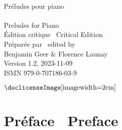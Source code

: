 \documentclass[a4paper, 12pt]{book}
\newcommand{\bigdot}[0]{{\Large \textbullet}}
\begin{document}
\frontmatter


\begin{titlepage}
\begin{center}
   \\
  \vspace{3.1 cm}
  {\fontsize{30}{40}\selectfont Préludes pour piano} \\
  \vspace{0.5 cm}
  {\fontsize{30}{40}\selectfont \textbullet} \\
  \vspace{0.35 cm}
  {\fontsize{30}{40}\selectfont Preludes for Piano} \\
  \vspace{3.1 cm}
  {\Large Édition critique \textbullet\ Critical Edition} \\
  \vspace{3.1 cm}
  {\Large Préparée par \textbullet\ \foreignlanguage{english}{edited by}} \\
  \vspace{0.25 cm}
  {\Large Benjamin Geer \& Florence Launay} \\
  \vspace{3.1 cm}
  {\footnotesize Version 1.2, 2023-11-09} \\
  \vspace{0.1 cm}
  {\footnotesize ISMN 979-0-707186-03-9} \\
  \vspace{0.25 cm}
  \begin{minipage}{\textwidth}
  \centering
  $\vcenter{\hbox{\doclicenseImage[imagewidth=2cm]}}$
  \end{minipage}
  \end{center}
\end{titlepage}


\chapter*{Préface \bigdot\ \foreignlanguage{english}{Preface}}
\end{document}
